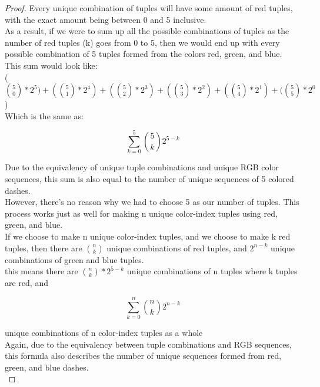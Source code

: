 \documentclass[11pt,fleqn]{article}
\theoremstyle{definition}
\theoremstyle{remark}
\begin{document}
\begin{enumerate}
\begin{proof}
        Every unique combination of tuples will have some amount of 
        red tuples, with the exact amount being between 0 and 5 
        inclusive.\\

        As a result, if we were to sum up all the possible combinations
        of tuples as the number of red tuples (k) 
        goes from 0 to 5, then we would end up with every
        possible combination of 5 tuples formed from the colors red, green,
        and blue.\\

        This sum would look like:\\

        ($\binom{5}{0} * {2}^{5}) + (\binom{5}{1} * {2}^{4}) + 
        (\binom{5}{2} * {2}^{3}) + (\binom{5}{3} * {2}^{2}) +
        (\binom{5}{4} * {2}^{1}) + (\binom{5}{5} * {2}^{0}$)\\

        Which is the same as:

        \[
        \sum_{k=0}^{5} \binom{5}{k} 2^{5 - k}
        \]

        Due to the equivalency of unique tuple combinations and
        unique RGB color sequences, this sum is also equal to the 
        number of unique sequences of 5 colored dashes.\\

        However, there's no reason why we had to choose 5 as our number
        of tuples. This process works just as well for making
        n unique color-index tuples using red, green, and blue.\\

        If we choose to make n unique color-index tuples, and we choose
        to make k red tuples, then there are $\binom{n}{k}$ unique
        combinations of red tuples, and ${2}^{n-k}$ unique combinations
        of green and blue tuples.\\

        this means there are $\binom{n}{k} * {2}^{5-k}$ unique 
        combinations of n tuples where k tuples are red, and 

        \[
        \sum_{k=0}^{n} \binom{n}{k} 2^{n - k}
        \]

        unique combinations of n color-index tuples as a whole\\

        Again, due to the equivalency between tuple combinations 
        and RGB sequences, this formula also describes the number
        of unique sequences formed from red, green, and blue dashes.\\


\end{proof}
\end{enumerate}
\end{document}
